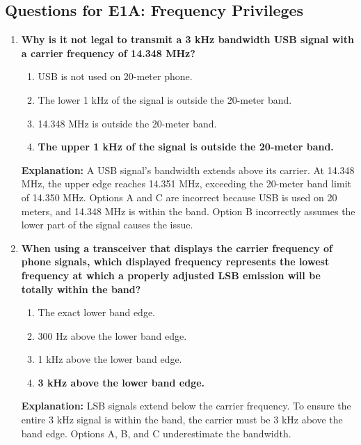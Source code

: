 \subsection*{Questions for E1A: Frequency Privileges}
\begin{enumerate}
    \item \textbf{Why is it not legal to transmit a 3 kHz bandwidth USB signal with a carrier frequency of 14.348 MHz?}
    \begin{enumerate}
        \item USB is not used on 20-meter phone.\\
        \item The lower 1 kHz of the signal is outside the 20-meter band.\\
        \item 14.348 MHz is outside the 20-meter band.\\
        \item \textbf{The upper 1 kHz of the signal is outside the 20-meter band.}
    \end{enumerate}
    \textbf{Explanation:} A USB signal's bandwidth extends above its carrier. At 14.348 MHz, the upper edge reaches 14.351 MHz, exceeding the 20-meter band limit of 14.350 MHz. Options A and C are incorrect because USB is used on 20 meters, and 14.348 MHz is within the band. Option B incorrectly assumes the lower part of the signal causes the issue.

    \item \textbf{When using a transceiver that displays the carrier frequency of phone signals, which displayed frequency represents the lowest frequency at which a properly adjusted LSB emission will be totally within the band?}
    \begin{enumerate}
        \item The exact lower band edge.\\
        \item 300 Hz above the lower band edge.\\
        \item 1 kHz above the lower band edge.\\
        \item \textbf{3 kHz above the lower band edge.}
    \end{enumerate}
    \textbf{Explanation:} LSB signals extend below the carrier frequency. To ensure the entire 3 kHz signal is within the band, the carrier must be 3 kHz above the band edge. Options A, B, and C underestimate the bandwidth.


\end{enumerate}
